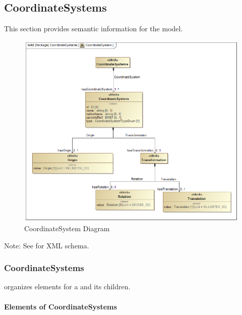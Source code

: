 \subsection{CoordinateSystems} \label{sec:CoordinateSystems}


This section provides semantic information for the  model.

\begin{figure}[ht]
  \centering
    \includegraphics[width=1.0\textwidth]{figures/CoordinateSystem.png}
  \caption{CoordinateSystem Diagram}
  \label{fig:CoordinateSystem Diagram}
\end{figure}

\FloatBarrier


Note: See  for XML schema.


\subsubsection{CoordinateSystems}




 \glspl{organize}  elements for a  and its children.


\paragraph{Elements of CoordinateSystems}\mbox{}
\label{sec:Elements of CoordinateSystems}

